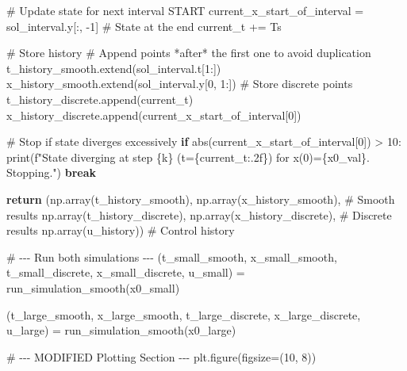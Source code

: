\documentclass[
  letterpaper,
  DIV=11,
  numbers=noendperiod,
  oneside]{scrartcl}
\newenvironment{Shaded}{\begin{snugshade}}{\end{snugshade}}
\newcommand{\BuiltInTok}[1]{\textcolor[rgb]{0.00,0.23,0.31}{#1}}
\newcommand{\CommentTok}[1]{\textcolor[rgb]{0.37,0.37,0.37}{#1}}
\newcommand{\ControlFlowTok}[1]{\textcolor[rgb]{0.00,0.23,0.31}{\textbf{#1}}}
\newcommand{\DecValTok}[1]{\textcolor[rgb]{0.68,0.00,0.00}{#1}}
\newcommand{\NormalTok}[1]{\textcolor[rgb]{0.00,0.23,0.31}{#1}}
\newcommand{\OperatorTok}[1]{\textcolor[rgb]{0.37,0.37,0.37}{#1}}
\newcommand{\SpecialCharTok}[1]{\textcolor[rgb]{0.37,0.37,0.37}{#1}}
\newcommand{\SpecialStringTok}[1]{\textcolor[rgb]{0.13,0.47,0.30}{#1}}
\begin{document}
\begin{Shaded}
\begin{Highlighting}[numbers=left,,]
        \CommentTok{\# Update state for next interval START}
\NormalTok{        current\_x\_start\_of\_interval }\OperatorTok{=}\NormalTok{ sol\_interval.y[:, }\OperatorTok{{-}}\DecValTok{1}\NormalTok{] }\CommentTok{\# State at the end}
\NormalTok{        current\_t }\OperatorTok{+=}\NormalTok{ Ts}

        \CommentTok{\# Store history}
        \CommentTok{\# Append points *after* the first one to avoid duplication}
\NormalTok{        t\_history\_smooth.extend(sol\_interval.t[}\DecValTok{1}\NormalTok{:])}
\NormalTok{        x\_history\_smooth.extend(sol\_interval.y[}\DecValTok{0}\NormalTok{, }\DecValTok{1}\NormalTok{:])}
        \CommentTok{\# Store discrete points}
\NormalTok{        t\_history\_discrete.append(current\_t)}
\NormalTok{        x\_history\_discrete.append(current\_x\_start\_of\_interval[}\DecValTok{0}\NormalTok{])}


        \CommentTok{\# Stop if state diverges excessively}
        \ControlFlowTok{if} \BuiltInTok{abs}\NormalTok{(current\_x\_start\_of\_interval[}\DecValTok{0}\NormalTok{]) }\OperatorTok{\textgreater{}} \DecValTok{10}\NormalTok{:}
            \BuiltInTok{print}\NormalTok{(}\SpecialStringTok{f"State diverging at step }\SpecialCharTok{\{}\NormalTok{k}\SpecialCharTok{\}}\SpecialStringTok{ (t=}\SpecialCharTok{\{}\NormalTok{current\_t}\SpecialCharTok{:.2f\}}\SpecialStringTok{) for x(0)=}\SpecialCharTok{\{}\NormalTok{x0\_val}\SpecialCharTok{\}}\SpecialStringTok{. Stopping."}\NormalTok{)}
            \ControlFlowTok{break}

    \ControlFlowTok{return}\NormalTok{ (np.array(t\_history\_smooth), np.array(x\_history\_smooth), }\CommentTok{\# Smooth results}
\NormalTok{            np.array(t\_history\_discrete), np.array(x\_history\_discrete), }\CommentTok{\# Discrete results}
\NormalTok{            np.array(u\_history)) }\CommentTok{\# Control history}

\CommentTok{\# {-}{-}{-} Run both simulations {-}{-}{-}}
\NormalTok{(t\_small\_smooth, x\_small\_smooth,}
\NormalTok{ t\_small\_discrete, x\_small\_discrete, u\_small) }\OperatorTok{=}\NormalTok{ run\_simulation\_smooth(x0\_small)}

\NormalTok{(t\_large\_smooth, x\_large\_smooth,}
\NormalTok{ t\_large\_discrete, x\_large\_discrete, u\_large) }\OperatorTok{=}\NormalTok{ run\_simulation\_smooth(x0\_large)}


\CommentTok{\# {-}{-}{-} MODIFIED Plotting Section {-}{-}{-}}
\NormalTok{plt.figure(figsize}\OperatorTok{=}\NormalTok{(}\DecValTok{10}\NormalTok{, }\DecValTok{8}\NormalTok{))}


\end{Highlighting}
\end{Shaded}
\end{document}
